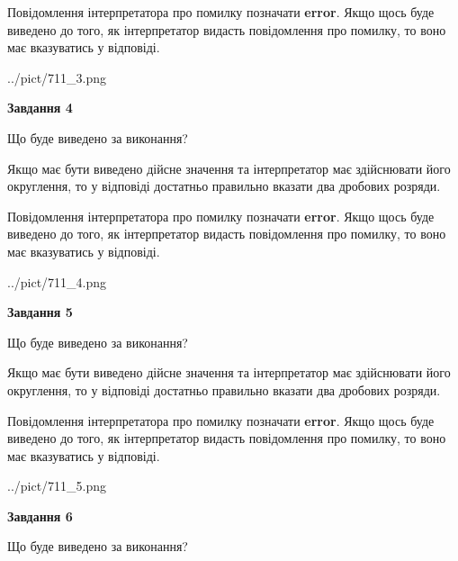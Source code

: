\documentclass[12pt, ukrainian]{article}
\begin{document}
{\begin {Large}
Повідомлення інтерпретатора про помилку позначати \textbf{error}.
Якщо щось буде виведено до того, як інтерпретатор видасть повідомлення про помилку, 
то воно має вказуватись у відповіді. \par

\begin{center}
	{../pict/711_3.png}
\end{center}
\newpage

{\begin {center}\textbf{Завдання 4}\end {center}}\par
Що буде виведено за виконання? \par

Якщо має бути виведено дійсне значення та інтерпретатор має здійснювати його округлення, 
то у відповіді достатньо правильно вказати два дробових розряди.

Повідомлення інтерпретатора про помилку позначати \textbf{error}.
Якщо щось буде виведено до того, як інтерпретатор видасть повідомлення про помилку, 
то воно має вказуватись у відповіді. \par

\begin{center}
	{../pict/711_4.png}
\end{center}
\newpage

{\begin {center}\textbf{Завдання 5}\end {center}}\par
Що буде виведено за виконання? \par

Якщо має бути виведено дійсне значення та інтерпретатор має здійснювати його округлення, 
то у відповіді достатньо правильно вказати два дробових розряди.

Повідомлення інтерпретатора про помилку позначати \textbf{error}.
Якщо щось буде виведено до того, як інтерпретатор видасть повідомлення про помилку, 
то воно має вказуватись у відповіді. \par

\begin{center}
	{../pict/711_5.png}
\end{center}
\newpage

{\begin {center}\textbf{Завдання 6}\end {center}}\par
Що буде виведено за виконання? \par


\end{Large}}
\end{document}
